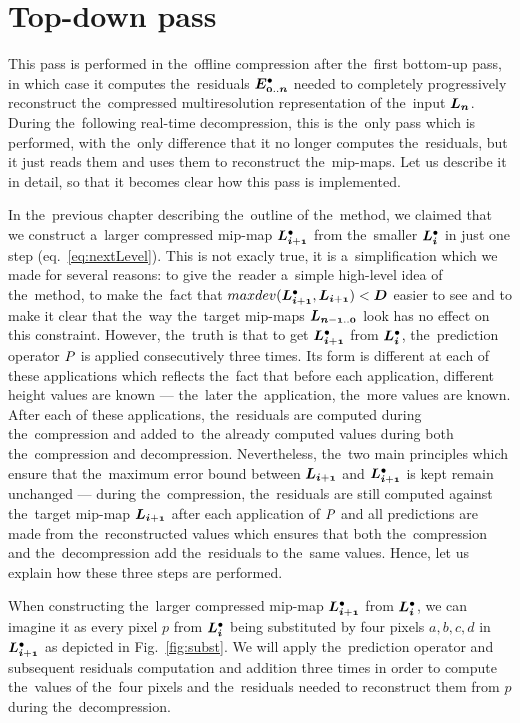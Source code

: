 \section{Top-down pass}\label{sec:top-down}
This pass is performed in the~offline compression after the~first bottom-up pass, in which case it computes the~residuals $\objdot{E}{0..n}$ needed to completely progressively reconstruct the~compressed multiresolution representation of the~input $\lnorm{n}$. During the~following real-time decompression, this is the~only pass which is performed, with the~only difference that it no longer computes the~residuals, but it just reads them and uses them to reconstruct the~mip-maps. Let us describe it in detail, so that it becomes clear how this pass is implemented.

In the~previous chapter describing the~outline of the~method, we claimed that we construct a~larger compressed mip-map $\ldot{i+1}$ from the~smaller $\ldot{i}$ in just one step (eq.~\ref{eq:nextLevel}). This is not exacly true, it is a~simplification which we made for several reasons: to give the~reader a~simple high-level idea of the~method, to make the~fact that $maxdev(\ldot{i+1}, \lnorm{i+1}) < \objnorm{D}{}$ easier to see and to make it clear that the~way the~target mip-maps $\lnorm{n-1..0}$ look has no effect on this constraint. However, the~truth is that to get $\ldot{i+1}$ from $\ldot{i}$, the~prediction operator $\mathit{P_{}}$ is applied consecutively three times. Its form is different at each of these applications which reflects the~fact that before each application, different height values are known --- the~later the~application, the~more values are known. After each of these applications, the~residuals are computed during the~compression and added to~the already computed values during both the~compression and decompression. Nevertheless, the~two main principles which ensure that the~maximum error bound between $\lnorm{i+1}$ and $\ldot{i+1}$ is kept remain unchanged --- during the~compression, the~residuals are still computed against the~target mip-map $\lnorm{i+1}$ after each application of $\mathit{P_{}}$ and all predictions are made from the~reconstructed values which ensures that both the~compression and the~decompression add the~residuals to the~same values. Hence, let us explain how these three steps are performed.

 When constructing the~larger compressed mip-map $\ldot{i+1}$ from $\ldot{i}$, we can imagine it as every pixel $p$ from $\ldot{i}$ being substituted by four pixels $a, b, c, d$ in $\ldot{i+1}$ as depicted in Fig.~\ref{fig:subst}. We will apply the~prediction operator and subsequent residuals computation and addition three times in order to compute the~values of the~four pixels and the~residuals needed to reconstruct them from $p$ during the~decompression.

